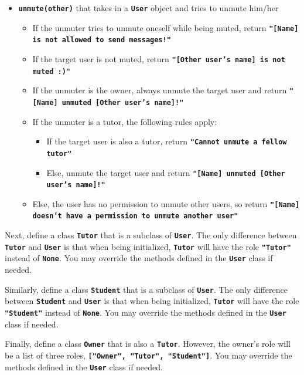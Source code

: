 \begin{itemize}
    \item \texttt{\bfseries unmute(other)} that takes in a \texttt{\bfseries User} object and tries to unmute him/her
    \begin{itemize}
        \item If the unmuter tries to unmute oneself while being muted, return \texttt{\bfseries "[Name] is not allowed to send messages!"}
        \item If the target user is not muted, return \texttt{\bfseries "[Other user's name] is not muted :)"}
        \item If the unmuter is the owner, always unmute the target user and return 
        \texttt{\bfseries "[Name] unmuted [Other user's name]!"}
        \item If the unmuter is a tutor, the following rules apply:
        \begin{itemize}
            \item If the target user is also a tutor, return \texttt{\bfseries "Cannot unmute a fellow tutor"}
            \item Else, unmute the target user and return \texttt{\bfseries "[Name] unmuted [Other user's name]!"}
        \end{itemize}
        \item Else, the user has no permission to unmute other users, so return 
        \texttt{\bfseries "[Name] doesn't have a permission to unmute another user"}
    \end{itemize}
\end{itemize}

Next, define a class \texttt{\bfseries Tutor} that is a subclass of \texttt{\bfseries User}. The only difference between \texttt{\bfseries Tutor} 
and \texttt{\bfseries User} is that when being initialized, \texttt{\bfseries Tutor} will have the role \texttt{\bfseries "Tutor"} instead 
of \texttt{\bfseries None}. You may override the methods defined in the \texttt{\bfseries User} class if needed.

Similarly, define a class \texttt{\bfseries Student} that is a subclass of \texttt{\bfseries User}. The only difference between \texttt{\bfseries Student} 
and \texttt{\bfseries User} is that when being initialized, \texttt{\bfseries Tutor} will have the role \texttt{\bfseries "Student"} instead 
of \texttt{\bfseries None}. You may override the methods defined in the \texttt{\bfseries User} class if needed.

Finally, define a class \texttt{\bfseries Owner} that is also a \texttt{\bfseries Tutor}. However, the owner's role will be a list of three roles,
\texttt{\bfseries ["Owner", "Tutor", "Student"]}. You may override the methods defined in the \texttt{\bfseries User} class if needed.
